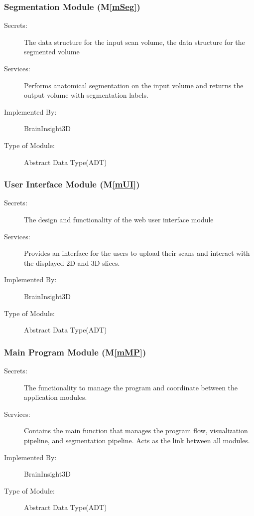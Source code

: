 \documentclass[12pt, titlepage]{article}
\newcommand{\mref}[1]{M\ref{#1}}
\begin{document}
\subsubsection{Segmentation Module (\mref{mSeg})}

\begin{description}
  \item[Secrets:] The data structure for the input scan volume, the data structure for the segmented volume
  \item[Services:]Performs anatomical segmentation on the input volume and returns the output volume with segmentation labels.

  \item[Implemented By:] BrainInsight3D
  \item[Type of Module:] Abstract Data Type(ADT)
\end{description}

\subsubsection{User Interface Module (\mref{mUI})}

\begin{description}
  \item[Secrets:]The design and functionality of the web user interface module
  \item[Services:] Provides an interface for the users to upload their scans and interact with the displayed
        2D and 3D slices.
  \item[Implemented By:] BrainInsight3D
  \item[Type of Module:] Abstract Data Type(ADT)
\end{description}

\subsubsection{Main Program Module (\mref{mMP})}

\begin{description}
  \item[Secrets:]The functionality to manage the program and coordinate between the application modules.
  \item[Services:] Contains the main function that manages the program flow, visualization pipeline, and
        segmentation pipeline. Acts as the link between all modules.
  \item[Implemented By:] BrainInsight3D
  \item[Type of Module:] Abstract Data Type(ADT)
\end{description}
\end{document}
